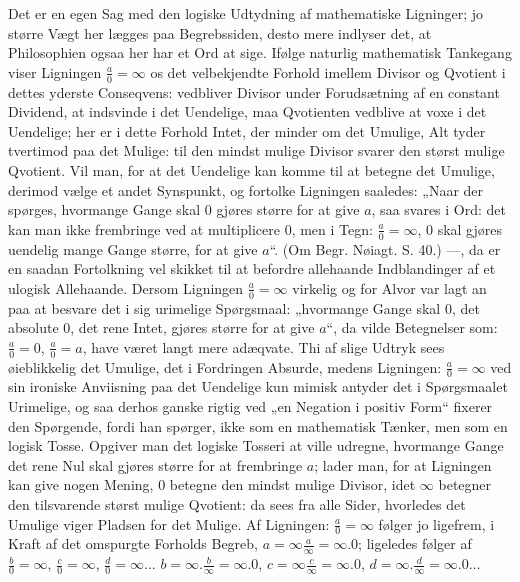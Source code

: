 \documentclass[12pt,a4paper]{book}
\begin{document}
Det er en egen Sag med den logiske Udtydning af mathematiske
Ligninger; jo større Vægt her lægges paa Begrebssiden, desto mere
indlyser det, at Philosophien ogsaa her har et Ord at sige. Ifølge
naturlig mathematisk Tankegang viser Ligningen
$\frac{a}{0} = \infty$ os det velbekjendte Forhold imellem
Divisor og Qvotient i dettes yderste Conseqvens: vedbliver Divisor
under Forudsætning af en constant Dividend, at indsvinde i det
Uendelige, maa Qvotienten vedblive at voxe i det Uendelige; her er i
dette Forhold Intet, der minder om det Umulige, Alt tyder tvertimod
paa det Mulige: til den mindst mulige Divisor svarer den størst mulige
Qvotient. Vil man, for at det Uendelige kan komme til at betegne det
Umulige, derimod vælge et andet Synspunkt, og fortolke Ligningen
saaledes: „Naar der spørges, hvormange Gange skal $0$ gjøres større
for at give $a$, saa svares i Ord: det kan man ikke frembringe ved at
multiplicere $0$, men i Tegn: $\frac{a}{0} = \infty$, $0$ skal gjøres
uendelig mange Gange større, for at give $a$“. (Om Begr. Nøiagt.
S. 40.) ---, da er en saadan Fortolkning vel skikket til at befordre
allehaande Indblandinger af et ulogisk Allehaande. Dersom Ligningen
$\frac{a}{0} = \infty$ virkelig og for Alvor var lagt an paa at
besvare det i sig urimelige Spørgsmaal: „hvormange Gange skal $0$, det
absolute $0$, det rene Intet, gjøres større for at give $a$“, da vilde
Betegnelser som: $\frac{a}{0} = 0$, $\frac{a}{0} = a$, have været
langt mere adæqvate. Thi af slige Udtryk sees øieblikkelig det
Umulige, det i Fordringen Absurde, medens Ligningen:
$\frac{a}{0} = \infty$ ved sin ironiske Anviisning paa det Uendelige
kun mimisk antyder det i Spørgsmaalet Urimelige, og saa derhos ganske
rigtig ved „en Negation i positiv Form“ fixerer den Spørgende, fordi
han spørger, ikke som en mathematisk Tænker, men som en logisk Tosse.
Opgiver man det logiske Tosseri at ville udregne, hvormange Gange det
rene Nul skal gjøres større for at frembringe $a$; lader man, for at
Ligningen kan give nogen Mening, $0$ betegne den mindst mulige
Divisor, idet $\infty$ betegner den tilsvarende størst mulige
Qvotient: da sees fra alle Sider,
hvorledes det Umulige viger Pladsen for det Mulige. Af Ligningen:
$\frac{a}{0} = \infty$ følger jo ligefrem, i Kraft af det omspurgte
Forholds Begreb, $a = \infty \frac{a}{\infty} = \infty.0$; ligeledes
følger af $\frac{b}{0} = \infty$, $\frac{c}{0} = \infty$,
$\frac{d}{0} = \infty\ldots$ $b = \infty.\frac{b}{\infty} = \infty.0$,
$c = \infty \frac{c}{\infty} = \infty.0$,
$d = \infty.\frac{d}{\infty} = \infty.0\ldots$
\end{document}
